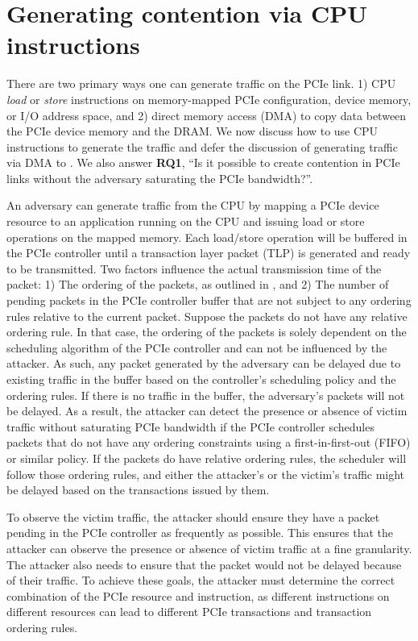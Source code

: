 \section{Generating contention via CPU instructions}
\label{sec:interconnect-sc-store-ops}

There are two primary ways one can generate traffic on the PCIe link.
1) CPU \textit{load} or \textit{store} instructions on memory-mapped PCIe configuration, device memory, or I/O address space, and 
2) direct memory access (DMA) to copy data between the PCIe device memory and the DRAM.
We now discuss how to use CPU instructions to generate the traffic and defer the discussion of generating traffic via DMA to .
We also answer \textbf{RQ1}, ``Is it possible to create contention in PCIe links without the adversary saturating the PCIe bandwidth?''.

An adversary can generate traffic from the CPU by mapping a PCIe device resource to an application running on the CPU and issuing load or store operations on the mapped memory.
Each load/store operation will be buffered in the PCIe controller until a transaction layer packet (TLP) is generated and ready to be transmitted.
Two factors influence the actual transmission time of the packet:
1) The ordering of the packets, as outlined in , and
2) The number of pending packets in the PCIe controller buffer that are not subject to any ordering rules relative to the current packet.
Suppose the packets do not have any relative ordering rule. 
In that case, the ordering of the packets is solely dependent on the scheduling algorithm of the PCIe controller and can not be influenced by the attacker.
As such, any packet generated by the adversary can be delayed due to existing traffic in the buffer based on the controller's scheduling policy and the ordering rules.
If there is no traffic in the buffer, the adversary's packets will not be delayed.
As a result, the attacker can detect the presence or absence of victim traffic without saturating PCIe bandwidth if the PCIe controller schedules packets that do not have any ordering constraints using a first-in-first-out (FIFO) or similar policy.
If the packets do have relative ordering rules, the scheduler will follow those ordering rules, and either the attacker's or the victim's traffic might be delayed based on the transactions issued by them.

To observe the victim traffic, the attacker should ensure they have a packet pending in the PCIe controller as frequently as possible.
This ensures that the attacker can observe the presence or absence of victim traffic at a fine granularity.
The attacker also needs to ensure that the packet would not be delayed because of their traffic.
To achieve these goals, the attacker must determine the correct combination of the PCIe resource and instruction, as different instructions on different resources can lead to different PCIe transactions and transaction ordering rules.




% 
